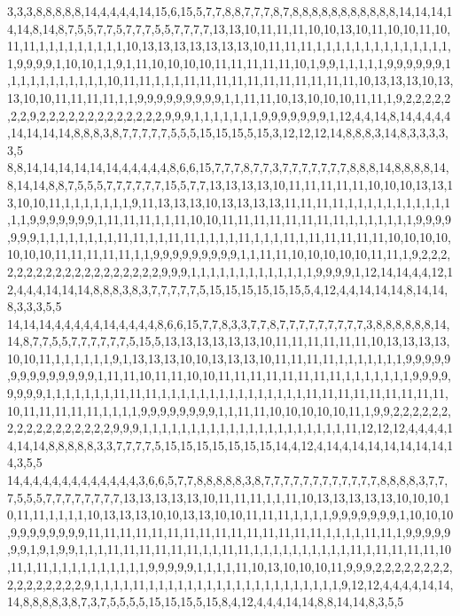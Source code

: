 3,3,3,8,8,8,8,8,14,4,4,4,4,14,15,6,15,5,7,7,8,8,7,7,7,8,7,8,8,8,8,8,8,8,8,8,8,8,14,14,14,14,14,8,14,8,7,5,5,7,7,5,7,7,7,5,5,7,7,7,7,13,13,10,11,11,11,10,10,13,10,11,10,10,11,10,11,11,1,1,1,1,1,1,1,1,1,10,13,13,13,13,13,13,13,10,11,11,11,1,1,1,1,1,1,1,1,1,1,1,1,1,1,1,9,9,9,9,1,10,10,1,1,9,1,11,10,10,10,10,11,11,11,11,11,10,1,9,9,1,1,1,1,1,9,9,9,9,9,9,1,1,1,1,1,1,1,1,1,1,1,10,11,11,1,1,1,11,11,11,11,11,11,11,11,11,11,11,10,13,13,13,10,13,13,10,10,11,11,11,11,1,1,9,9,9,9,9,9,9,9,9,1,1,11,11,10,13,10,10,10,11,11,1,9,2,2,2,2,2,2,2,9,2,2,2,2,2,2,2,2,2,2,2,2,2,9,9,9,1,1,1,1,1,1,1,9,9,9,9,9,9,9,1,12,4,4,14,8,14,4,4,4,4,14,14,14,14,8,8,8,3,8,7,7,7,7,7,5,5,5,15,15,15,5,15,3,12,12,12,14,8,8,8,3,14,8,3,3,3,3,3,5
8,8,14,14,14,14,14,14,4,4,4,4,4,8,6,6,15,7,7,7,8,7,7,3,7,7,7,7,7,7,7,8,8,8,14,8,8,8,8,14,8,14,14,8,8,7,5,5,5,7,7,7,7,7,7,15,5,7,7,13,13,13,13,10,11,11,11,11,11,10,10,10,13,13,13,10,10,11,1,1,1,1,1,1,1,9,11,13,13,13,10,13,13,13,13,11,11,11,11,1,1,1,1,1,1,1,1,1,1,1,1,1,9,9,9,9,9,9,9,1,11,11,11,1,1,11,10,10,11,11,11,11,11,11,11,11,1,1,1,1,1,1,1,9,9,9,9,9,9,9,1,1,1,1,1,1,1,1,11,11,1,1,11,11,1,1,1,1,11,1,1,1,11,1,11,11,11,11,11,10,10,10,10,10,10,10,11,11,11,11,11,1,1,9,9,9,9,9,9,9,9,9,1,1,11,11,10,10,10,10,10,11,11,1,9,2,2,2,2,2,2,2,2,2,2,2,2,2,2,2,2,2,2,2,9,9,9,1,1,1,1,1,1,1,1,1,1,1,1,1,9,9,9,9,1,12,14,14,4,4,12,12,4,4,4,14,14,14,8,8,8,3,8,3,7,7,7,7,7,5,15,15,15,15,15,15,5,4,12,4,4,14,14,14,8,14,14,8,3,3,3,5,5
14,14,14,4,4,4,4,4,14,4,4,4,4,8,6,6,15,7,7,8,3,3,7,7,8,7,7,7,7,7,7,7,7,7,3,8,8,8,8,8,8,14,14,8,7,7,5,5,7,7,7,7,7,7,5,15,5,13,13,13,13,13,13,10,11,11,11,11,11,11,10,13,13,13,13,10,10,11,1,1,1,1,1,1,9,1,13,13,13,10,10,13,13,13,10,11,11,11,11,1,1,1,1,1,1,1,9,9,9,9,9,9,9,9,9,9,9,9,9,9,1,11,11,10,11,11,10,10,11,11,11,11,11,11,11,11,1,1,1,1,1,1,1,9,9,9,9,9,9,9,9,1,1,1,1,1,1,1,11,11,11,1,1,1,1,1,1,1,1,1,1,1,1,1,1,1,11,11,11,11,11,11,11,11,11,10,11,11,11,11,11,1,1,1,1,9,9,9,9,9,9,9,9,1,1,11,11,10,10,10,10,10,11,1,9,9,2,2,2,2,2,2,2,2,2,2,2,2,2,2,2,2,2,9,9,9,1,1,1,1,1,1,1,1,1,1,1,1,1,1,1,1,1,1,1,1,1,11,12,12,12,4,4,4,4,14,14,14,8,8,8,8,8,3,3,7,7,7,7,5,15,15,15,15,15,15,15,14,4,12,4,14,4,14,14,14,14,14,14,14,3,5,5
14,4,4,4,4,4,4,4,4,4,4,4,4,3,6,6,5,7,7,8,8,8,8,8,3,8,7,7,7,7,7,7,7,7,7,7,7,7,8,8,8,8,3,7,7,7,5,5,5,7,7,7,7,7,7,7,7,13,13,13,13,13,10,11,11,11,1,1,11,10,13,13,13,13,13,10,10,10,10,11,11,1,1,1,1,10,13,13,13,10,10,13,13,10,10,11,11,11,1,1,1,1,9,9,9,9,9,9,9,1,10,10,10,9,9,9,9,9,9,9,9,11,11,11,11,11,11,11,11,11,11,11,11,11,11,11,1,1,1,1,11,11,1,9,9,9,9,9,9,9,1,9,1,9,9,1,1,1,11,11,11,11,11,11,1,1,11,11,1,1,1,1,1,1,1,1,1,1,11,1,11,11,11,11,10,11,1,11,1,1,1,1,1,1,1,1,1,1,9,9,9,9,9,1,1,1,1,11,10,13,10,10,10,11,9,9,9,2,2,2,2,2,2,2,2,2,2,2,2,2,2,2,2,9,1,1,1,1,11,1,1,1,1,1,1,1,1,1,1,1,1,1,1,1,1,1,1,1,1,9,12,12,4,4,4,4,14,14,14,8,8,8,8,3,8,7,3,7,5,5,5,5,15,15,15,5,15,8,4,12,4,4,4,14,14,8,8,14,14,8,3,5,5
